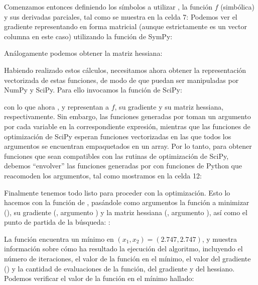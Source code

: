 Comenzamos entonces definiendo los símbolos a utilizar , la función $f$ (simbólica) y sus derivadas parciales, tal como se muestra en la celda 7:
Podemos ver el gradiente representando en forma matricial (aunque estrictamente es un vector columna en este caso) utilizando la función  de SymPy:

Análogamente podemos obtener la matriz hessiana:

Habiendo realizado estos cálculos, necesitamos ahora obtener la representación vectorizada de estas funciones, de modo de que puedan ser manipuladas por NumPy y SciPy. Para ello invocamos la función  de SciPy:


\noindent con lo que ahora ,  y  representan a $f$, su gradiente y su matriz hessiana, respectivamente. Sin embargo, las funciones generadas por  toman un argumento por cada variable en la correspondiente expresión, mientras que las funciones de optimización de SciPy esperan funciones vectorizadas en las que todos los argumentos se encuentran empaquetados en un array. Por lo tanto, para obtener funciones que sean compatibles con las rutinas de optimización de SciPy, debemos ``envolver'' las funciones generadas por  con funciones de Python que reacomoden los argumentos, tal como mostramos en la celda 12:

Finalmente tenemos todo listo para proceder con la optimización. Esto lo hacemos con la función  de , pasándole como argumentos la función a minimizar (), su gradiente (, argumento ) y la matriz hessiana (, argumento ), así como el punto de partida de la búsqueda: :


La función encuentra un mínimo en $(x_1, x_2) = (2.747, 2.747)$, y muestra información sobre cómo ha resultado la ejecución del algoritmo, incluyendo el número de iteraciones, el valor de la función en el mínimo, el valor del gradiente () y la cantidad de evaluaciones de la función, del gradiente y del hessiano. Podemos verificar el valor de la función en el mínimo hallado:

